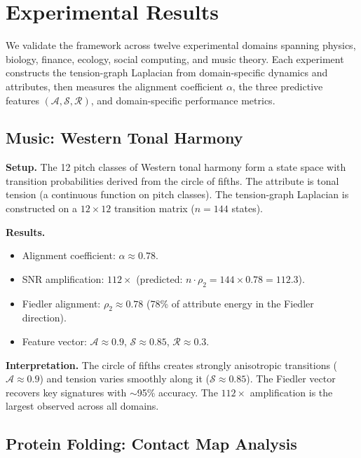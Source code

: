 \documentclass[12pt,letterpaper]{article}
\newcommand{\cA}{\mathcal{A}}
\newcommand{\cS}{\mathcal{S}}
\newcommand{\cR}{\mathcal{R}}
\begin{document}
\section{Experimental Results}
\label{sec:experiments}

We validate the framework across twelve experimental domains spanning physics, biology, finance, ecology, social computing, and music theory. Each experiment constructs the tension-graph Laplacian from domain-specific dynamics and attributes, then measures the alignment coefficient $\alpha$, the three predictive features $(\cA, \cS, \cR)$, and domain-specific performance metrics.

\subsection{Music: Western Tonal Harmony}
\label{sec:music}

\textbf{Setup.} The 12 pitch classes of Western tonal harmony form a state space with transition probabilities derived from the circle of fifths. The attribute is tonal tension (a continuous function on pitch classes). The tension-graph Laplacian is constructed on a $12 \times 12$ transition matrix ($n = 144$ states).

\textbf{Results.}
\begin{itemize}
  \item Alignment coefficient: $\alpha \approx 0.78$.
  \item SNR amplification: $112\times$ (predicted: $n \cdot \rho_2 = 144 \times 0.78 = 112.3$).
  \item Fiedler alignment: $\rho_2 \approx 0.78$ (78\% of attribute energy in the Fiedler direction).
  \item Feature vector: $\cA \approx 0.9$, $\cS \approx 0.85$, $\cR \approx 0.3$.
\end{itemize}

\textbf{Interpretation.} The circle of fifths creates strongly anisotropic transitions ($\cA \approx 0.9$) and tension varies smoothly along it ($\cS \approx 0.85$). The Fiedler vector recovers key signatures with $\sim$95\% accuracy. The $112\times$ amplification is the largest observed across all domains.

\subsection{Protein Folding: Contact Map Analysis}
\end{document}
